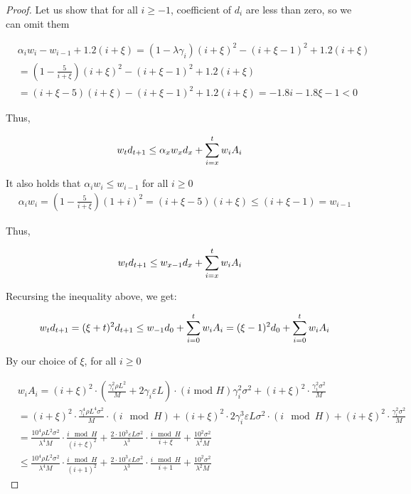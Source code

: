 \begin{proof}
Let us show that for all $i \geq -1$, coefficient of $d_i$ are less than zero, so we can omit them

\begin{align}
    &\alpha_i w_i - w_{i-1} + 1.2(i + \xi)
    = (1 - \lambda \gamma_i)(i + \xi)^2 - (i + \xi - 1)^2 + 1.2(i + \xi) \\
    &= (1 - \frac{5}{i + \xi})(i + \xi)^2 - (i + \xi - 1)^2 + 1.2(i + \xi) \\
    &= (i + \xi - 5)(i + \xi) - (i + \xi - 1)^2 + 1.2(i + \xi) = -1.8i - 1.8\xi - 1 < 0
\end{align}

Thus,

\begin{align}
    &w_t d_{t+1} \leq \alpha_x w_x d_x + \summ{i=x}{t} w_i A_i
\end{align}

It also holds that $\alpha_i w_i \leq w_{i-1}$ for all $i \geq 0$
\begin{align}
    \alpha_i w_i = (1 - \frac{5}{i+\xi})(1 + i)^2 = (i + \xi - 5)(i + \xi) \leq (i + \xi - 1) = w_{i-1}
\end{align}

Thus,

\begin{align}
    &w_t d_{t+1} \leq w_{x-1} d_x + \summ{i=x}{t} w_i A_i
\end{align}

Recursing the inequality above, we get:

\begin{align}
    w_t d_{t+1} = (\xi + t)^2 d_{t+1} \leq w_{-1} d_0 + \summ{i=0}{t} w_i A_i = (\xi - 1)^2 d_0 + \summ{i=0}{t} w_i A_i \label{eq:2804_1}
\end{align}

By our choice of $\xi$, for all $i \geq 0$

\begin{align}
    &w_i A_i = (i + \xi)^2 \cdot \left( \frac{\gamma_{i}^2 \rho L^2}{M} + 2 \gamma_{i} \varepsilon L \right) \cdot (i \text{ mod } H) \gamma_{i}^2 \sigma^2 + (i + \xi)^2 \cdot \frac{\gamma_{i}^2 \sigma^2}{M} \\
    &= (i+\xi)^2 \cdot \frac{\gamma_{i}^4 \rho L^4  \sigma^2}{M} \cdot (i \mod H)
    + (i+\xi)^2 \cdot 2\gamma_{i}^3\varepsilon L \sigma^2 \cdot (i \mod H)
    + (i + \xi)^2 \cdot \frac{\gamma_{i}^2 \sigma^2}{M} \\
    &= \frac{10^4 \rho L^2 \sigma^2}{\lambda^4 M} \cdot \frac{i \mod H}{(i+\xi)^2} 
    + \frac{2\cdot10^3\varepsilon L \sigma^2}{\lambda^3} \cdot \frac{i \mod H}{i+\xi}
    + \frac{10^2\sigma^2}{\lambda^2 M} \\
    &\leq
    \frac{10^4 \rho L^2 \sigma^2}{\lambda^4 M} \cdot \frac{i \mod H}{(i+1)^2} 
    + \frac{2\cdot10^3\varepsilon L \sigma^2}{\lambda^3} \cdot \frac{i \mod H}{i+1}
    + \frac{10^2\sigma^2}{\lambda^2 M}
\end{align}


\end{proof}
